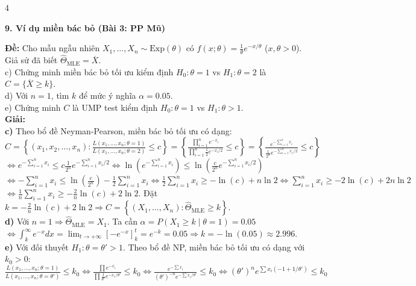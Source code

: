 \documentclass[a4paper,landscape]{article}
\newcommand{\sect}[1]{%
  \vspace{0.7pt}\noindent
  \colorbox{black!10}{\parbox{\dimexpr\linewidth-2\fboxsep\relax}{\bfseries #1}}%
  \vspace{0.2pt}\par}
\begin{document}
\begin{multicols*}{4}
\sect{9. Ví dụ miền bác bỏ (Bài 3: PP Mũ)}
\textbf{Đề:} Cho mẫu ngẫu nhiên $X_1,\dots,X_n \sim \text{Exp}(\theta)$ có $f(x;\theta)=\frac{1}{\theta} e^{-x/\theta}$ ($x,\theta > 0$). Giả sử đã biết $\hat\Theta_{\text{MLE}} = \overline X$. \\
c) Chứng minh miền bác bỏ tối ưu kiểm định $H_0:\theta=1$ vs $H_1:\theta=2$ là $C=\{\overline X \ge k\}$. \\
d) Với $n=1$, tìm $k$ để mức ý nghĩa $\alpha = 0.05$. \\
e) Chứng minh $C$ là UMP test kiểm định $H_0:\theta=1$ vs $H_1:\theta>1$. \\
\textbf{Giải:} \\
\textbf{c)} Theo bổ đề Neyman-Pearson, miền bác bỏ tối ưu có dạng: \\
$\displaystyle C = \left\{ (x_1, x_2, \ldots, x_n) : \frac{L(x_1, \dots, x_n; \theta=1)}{L(x_1, \dots, x_n; \theta=2)} \le c \right\} = \left\{ \frac{\prod_{i=1}^n e^{-x_i}}{\prod_{i=1}^n \frac{1}{2} e^{-x_i/2}} \le c \right\} = \left\{ \frac{e^{-\sum_{i=1}^n x_i}}{\frac{1}{2^n} e^{-\sum_{i=1}^n x_i/2}} \le c \right\}$ \\
$\displaystyle \Leftrightarrow e^{-\sum_{i=1}^n x_i} \le c \frac{1}{2^n} e^{-\sum_{i=1}^n x_i/2} \Leftrightarrow \ln\left(e^{-\sum_{i=1}^n x_i}\right) \le \ln\left(\frac{c}{2^n} e^{-\sum_{i=1}^n x_i/2}\right)$ \\
$\displaystyle \Leftrightarrow -\sum_{i=1}^n x_i \le \ln\left(\frac{c}{2^n}\right) - \frac{1}{2}\sum_{i=1}^n x_i \Leftrightarrow \frac{1}{2}\sum_{i=1}^n x_i \ge -\ln(c) + n\ln 2 \Leftrightarrow \sum_{i=1}^n x_i \ge -2\ln(c) + 2n\ln 2$ \\
$\displaystyle \Leftrightarrow \frac{1}{n}\sum_{i=1}^n x_i \ge -\frac{2}{n}\ln(c) + 2\ln 2$. Đặt $k = -\frac{2}{n}\ln(c) + 2\ln 2 \Rightarrow C = \left\{ (X_1, \ldots, X_n) : \hat\Theta_{\text{MLE}} \ge k \right\}$. \\
\textbf{d)} Với $n=1 \Rightarrow \hat\Theta_{\text{MLE}} = X_1$. Ta cần $\alpha = P(X_1 \ge k \mid \theta=1) = 0.05$ \\
$\displaystyle \Leftrightarrow \int_k^\infty e^{-x} dx = \lim_{t\to+\infty}[-e^{-x}]_k^t = e^{-k} = 0.05 \Rightarrow k = -\ln(0.05) \approx 2.996$. \\
\textbf{e)} Với đối thuyết $H_1:\theta = \theta' > 1$. Theo bổ đề NP, miền bác bỏ tối ưu có dạng với $k_0>0$: \\
$\displaystyle \frac{L(x_1, \ldots, x_n; \theta=1)}{L(x_1, \ldots, x_n; \theta=\theta')} \le k_0 \Leftrightarrow \frac{\prod e^{-x_i}}{\prod \frac{1}{\theta'} e^{-x_i/\theta'}} \le k_0 \Leftrightarrow \frac{e^{-\sum x_i}}{(\theta')^{-n} e^{-\sum x_i/\theta'}} \le k_0 \Leftrightarrow (\theta')^n e^{\sum x_i (-1 + 1/\theta')} \le k_0$ \\

\end{multicols*}
\end{document}

